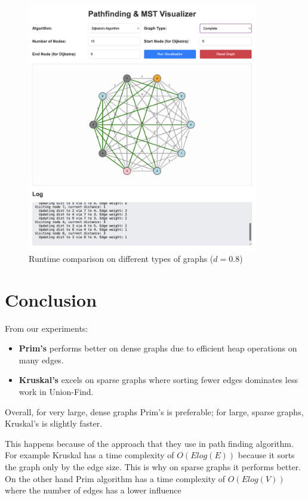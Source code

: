 \documentclass[12pt]{article}
\begin{document}
\begin{figure}[h]
    \centering
    \includegraphics[width=0.9\textwidth]{images/all.png}
    \caption{Runtime comparison on different types of graphs ($d=0.8$)}
    \label{fig:all}
\end{figure}

\clearpage
\section*{Conclusion}
From our experiments:
\begin{itemize}
  \item \textbf{Prim's} performs better on dense graphs due to efficient heap operations on many edges.
  \item \textbf{Kruskal's} excels on sparse graphs where sorting fewer edges dominates less work in Union-Find.
\end{itemize}
Overall, for very large, dense graphs Prim’s is preferable; for large, sparse graphs, Kruskal’s is slightly faster.

This happens because of the approach that they use in path finding algorithm. For example Kruskal has a time complexity of 
$ O(E log(E)) $ because it sorts the graph only by the edge size. This is why on sparse graphs it performs better.
On the other hand Prim algorithm has a time complexity of $O(E log(V))$ where the number of edges has a lower influence
\end{document}
